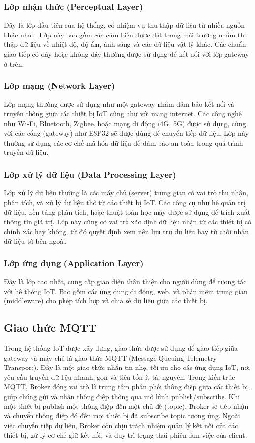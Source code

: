 \subsubsection{Lớp nhận thức (Perceptual Layer)}
Đây là lớp đầu tiên của hệ thống, có nhiệm vụ thu thập dữ liệu từ nhiều nguồn khác nhau. Lớp này bao gồm các cảm biến được đặt trong môi trường nhằm thu thập dữ liệu về nhiệt độ, độ ẩm, ánh sáng và các dữ liệu vật lý khác. Các chuẩn giao tiếp có dây hoặc không dây thường được sử dụng để kết nối với lớp gateway ở trên.
\subsubsection{Lớp mạng (Network Layer)}
Lớp mạng thường được sử dụng như một gateway nhằm đảm bảo kết nối và truyền thông giữa các thiết bị IoT cũng như với mạng internet. Các công nghệ như Wi-Fi, Bluetooth, Zigbee, hoặc mạng di động (4G, 5G) được sử dụng, cùng với các cổng (gateway) như ESP32 sẽ được dùng để chuyển tiếp dữ liệu. Lớp này thường sử dụng các cơ chế mã hóa dữ liệu để đảm bảo an toàn trong quá trình truyền dữ liệu.
\subsubsection{Lớp xử lý dữ liệu (Data Processing Layer)}
Lớp xử lý dữ liệu thường là các máy chủ (server) trung gian có vai trò thu nhận, phân tích, và xử lý dữ liệu thô từ các thiết bị IoT. Các công cụ như hệ quản trị dữ liệu, nền tảng phân tích, hoặc thuật toán học máy được sử dụng để trích xuất thông tin giá trị. Lớp này cũng có vai trò xác định dữ liệu nhận từ các thiết bị có chính xác hay không, từ đó quyết định xem nên lưu trữ dữ liệu hay từ chối nhận dữ liệu từ bên ngoài.
\subsubsection{Lớp ứng dụng (Application Layer)}
Đây là lớp cao nhất, cung cấp giao diện thân thiện cho người dùng để tương tác với hệ thống IoT. Bao gồm các ứng dụng di động, web, và phần mềm trung gian (middleware) cho phép tích hợp và chia sẻ dữ liệu giữa các thiết bị.

\subsection{Giao thức MQTT}
Trong hệ thống IoT được xây dựng, giao thức được sử dụng để giao tiếp giữa gateway và máy chủ là giao thức MQTT (Message Queuing Telemetry Transport). Đây là một giao thức nhắn tin nhẹ, tối ưu cho các ứng dụng IoT, nơi yêu cầu truyền dữ liệu nhanh, gọn và tiêu tốn ít tài nguyên. Trong kiến trúc MQTT, Broker đóng vai trò là trung tâm phân phối thông điệp giữa các thiết bị, giúp chúng gửi và nhận thông điệp thông qua mô hình publish/subscribe. Khi một thiết bị publish một thông điệp đến một chủ đề (topic), Broker sẽ tiếp nhận và chuyển thông điệp đó đến mọi thiết bị đã subscribe topic tương ứng. Ngoài việc chuyển tiếp dữ liệu, Broker còn chịu trách nhiệm quản lý kết nối của các thiết bị, xử lý cơ chế giữ kết nối, và duy trì trạng thái phiên làm việc của client. 

